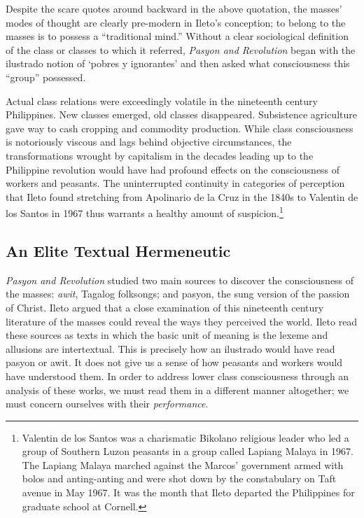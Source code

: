Despite the scare quotes around backward in the above quotation, the masses' modes of thought are clearly pre-modern in Ileto's conception; to belong to the masses is to possess a \enquote{traditional mind.} Without a clear sociological definition of the class or classes to which it referred, \textit{Pasyon and Revolution} began with the ilustrado notion of \enquote*{pobres y ignorantes} and then asked what consciousness this \enquote{group} possessed. 

Actual class relations were exceedingly volatile in the nineteenth century Philippines. New classes emerged, old classes disappeared. Subsistence agriculture gave way to cash cropping and commodity production. While class consciousness is notoriously viscous and lags behind objective circumstances, the transformations wrought by capitalism in the decades leading up to the Philippine revolution would have had profound effects on the consciousness of workers and peasants. The uninterrupted continuity in categories of perception that Ileto found stretching from Apolinario de la Cruz in the 1840s to Valentin de los Santos in 1967 thus warrants a healthy amount of suspicion.\footnote{Valentin de los Santos was a charismatic Bikolano religious leader who led a group of Southern Luzon peasants in a group called Lapiang Malaya in 1967. The Lapiang Malaya marched against the Marcos' government armed with bolos and anting-anting and were shot down by the constabulary on Taft avenue in May 1967. It was the month that Ileto departed the Philippines for graduate school at Cornell.}

\subsection{An Elite Textual Hermeneutic}

\textit{Pasyon and Revolution} studied two main sources to discover the consciousness of the masses: \textit{awit}, Tagalog folksongs; and pasyon, the sung version of the passion of Christ. Ileto argued that a close examination of this nineteenth century literature of the masses could reveal the ways they perceived the world. Ileto read these sources as texts in which the basic unit of meaning is the lexeme and allusions are intertextual. This is precisely how an ilustrado would have read pasyon or awit. It does not give us a sense of how peasants and workers would have understood them. In order to address lower class consciousness through an analysis of these works, we must read them in a different manner altogether; we must concern ourselves with their \textit{performance}.


